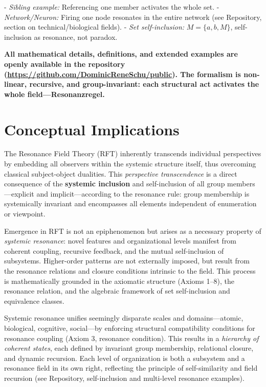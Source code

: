 \documentclass[12pt]{article}
\begin{document}
	- \textit{Sibling example:} Referencing one member activates the whole set.
	- \textit{Network/Neuron:} Firing one node resonates in the entire network (see Repository, section on technical/biological fields).
	- \textit{Set self-inclusion:} $M = \{a, b, M\}$, self-inclusion as resonance, not paradox.
	
	\medskip
	
	\textbf{All mathematical details, definitions, and extended examples are openly available in the repository (\url{https://github.com/DominicReneSchu/public}). The formalism is non-linear, recursive, and group-invariant: each structural act activates the whole field—Resonanzregel.}

	
	\section{Conceptual Implications}
	
	The Resonance Field Theory (RFT) inherently transcends individual perspectives by embedding all observers within the systemic structure itself, thus overcoming classical subject-object dualities. This \textit{perspective transcendence} is a direct consequence of the \textbf{systemic inclusion} and self-inclusion of all group members—explicit and implicit—according to the resonance rule: group membership is systemically invariant and encompasses all elements independent of enumeration or viewpoint.
	
	Emergence in RFT is not an epiphenomenon but arises as a necessary property of \textit{systemic resonance}: novel features and organizational levels manifest from coherent coupling, recursive feedback, and the mutual self-inclusion of subsystems. Higher-order patterns are not externally imposed, but result from the resonance relations and closure conditions intrinsic to the field. This process is mathematically grounded in the axiomatic structure (Axioms 1–8), the resonance relation, and the algebraic framework of set self-inclusion and equivalence classes.
	
	Systemic resonance unifies seemingly disparate scales and domains—atomic, biological, cognitive, social—by enforcing structural compatibility conditions for resonance coupling (Axiom 3, resonance condition). This results in a \textit{hierarchy of coherent states}, each defined by invariant group membership, relational closure, and dynamic recursion. Each level of organization is both a subsystem and a resonance field in its own right, reflecting the principle of self-similarity and field recursion (see Repository, self-inclusion and multi-level resonance examples).
	
\end{document}
